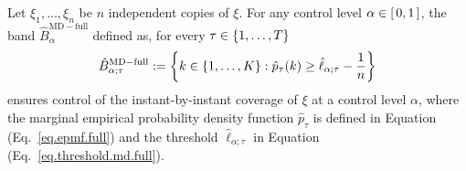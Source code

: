 \documentclass[11pt]{article}
\begin{document}
\begin{proposition}
\label{prop.ibib.md.full}
    Let $\xi_1, \ldots, \xi_n$ be $n$ independent copies of $\xi$.
    For any control level $\alpha \in \left[\, 0, 1 \,\right]$,
    the band $\hat{B}^{\mathrm{MD-full}}_{\alpha}$ defined as, for every $\tau \in \left\{ 1, \ldots, T \right\}$
    \begin{align}
    \label{eq.ibib.md.full}
        \hat{B}_{\alpha; \tau}^{\mathrm{MD-full}} := \left\{ 
            k \in \left\{ 1, \ldots, K \right\} :
            \hat{p}_{\tau}(k) \geq \hat{\ell}_{\alpha; \tau}  - \frac{1}{n}
         \right\}
    \end{align}
    ensures control of the instant-by-instant coverage of $\xi$ at a control level $\alpha$,
    where the marginal empirical probability density function $\hat{p}_{\tau}$ is defined in Equation (Eq.~\eqref{eq.epmf.full})
    and the threshold $\hat{\ell}_{\alpha; \tau}$ in Equation (Eq.~\eqref{eq.threshold.md.full}).
\end{proposition}
\end{document}
